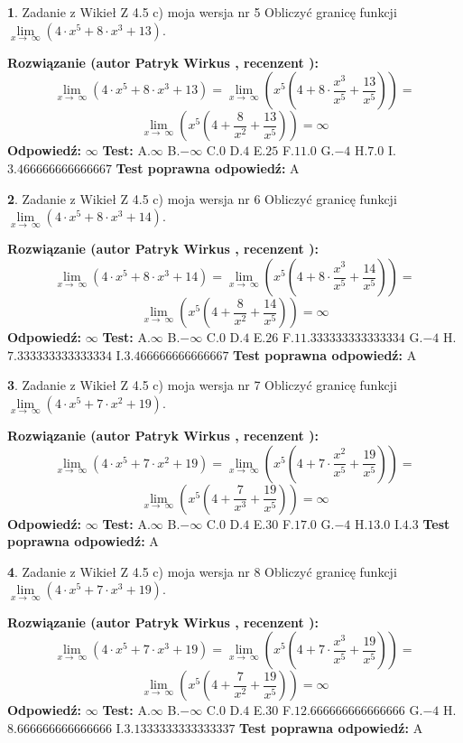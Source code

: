 \documentclass[12pt, a4paper]{article}
\theoremstyle{definition} %
\newtheorem{zad}{}
\newcommand{\zadStart}[1]{\begin{zad}#1\newline}
\newcommand{\zadStop}{\end{zad}}
\newcommand{\rozwStart}[2]{\noindent \textbf{Rozwiązanie (autor #1 , recenzent #2): }\newline}
\newcommand{\rozwStop}{\newline}
\newcommand{\odpStart}{\noindent \textbf{Odpowiedź:}\newline}
\newcommand{\odpStop}{\newline}
\newcommand{\testStart}{\noindent \textbf{Test:}\newline}
\newcommand{\testStop}{\newline}
\newcommand{\kluczStart}{\noindent \textbf{Test poprawna odpowiedź:}\newline}
\newcommand{\kluczStop}{\newline}
\begin{document}
\zadStart{Zadanie z Wikieł Z 4.5 c) moja wersja nr 5}
Obliczyć granicę funkcji  $\lim\limits_{x\to\ \infty}(4 \cdot x^{5}+8 \cdot x^{3}+13)$.
\zadStop
\rozwStart{Patryk Wirkus}{}
$$\lim\limits_{x\to\ \infty}(4 \cdot x^{5}+8 \cdot x^{3}+13) = \lim\limits_{x\to\ \infty}(x^{5}(4 +8 \cdot \frac{x^{3}}{x^{5}}+\frac{13}{x^{5}})) =$$ $$\lim\limits_{x\to\ \infty}(x^{5}(4 +\frac{8}{x^{2}}+\frac{13}{x^{5}})) =\infty$$
\rozwStop
\odpStart
$\infty$
\odpStop
\testStart
A.$\infty$ B.$-\infty$ C.$0$ D.$4$ E.$25$
F.$11.0$ G.$-4$
H.$7.0$
I.$3.466666666666667$
\testStop
\kluczStart
A
\kluczStop



\zadStart{Zadanie z Wikieł Z 4.5 c) moja wersja nr 6}
Obliczyć granicę funkcji  $\lim\limits_{x\to\ \infty}(4 \cdot x^{5}+8 \cdot x^{3}+14)$.
\zadStop
\rozwStart{Patryk Wirkus}{}
$$\lim\limits_{x\to\ \infty}(4 \cdot x^{5}+8 \cdot x^{3}+14) = \lim\limits_{x\to\ \infty}(x^{5}(4 +8 \cdot \frac{x^{3}}{x^{5}}+\frac{14}{x^{5}})) =$$ $$\lim\limits_{x\to\ \infty}(x^{5}(4 +\frac{8}{x^{2}}+\frac{14}{x^{5}})) =\infty$$
\rozwStop
\odpStart
$\infty$
\odpStop
\testStart
A.$\infty$ B.$-\infty$ C.$0$ D.$4$ E.$26$
F.$11.333333333333334$ G.$-4$
H.$7.333333333333334$
I.$3.466666666666667$
\testStop
\kluczStart
A
\kluczStop



\zadStart{Zadanie z Wikieł Z 4.5 c) moja wersja nr 7}
Obliczyć granicę funkcji  $\lim\limits_{x\to\ \infty}(4 \cdot x^{5}+7 \cdot x^{2}+19)$.
\zadStop
\rozwStart{Patryk Wirkus}{}
$$\lim\limits_{x\to\ \infty}(4 \cdot x^{5}+7 \cdot x^{2}+19) = \lim\limits_{x\to\ \infty}(x^{5}(4 +7 \cdot \frac{x^{2}}{x^{5}}+\frac{19}{x^{5}})) =$$ $$\lim\limits_{x\to\ \infty}(x^{5}(4 +\frac{7}{x^{3}}+\frac{19}{x^{5}})) =\infty$$
\rozwStop
\odpStart
$\infty$
\odpStop
\testStart
A.$\infty$ B.$-\infty$ C.$0$ D.$4$ E.$30$
F.$17.0$ G.$-4$
H.$13.0$
I.$4.3$
\testStop
\kluczStart
A
\kluczStop



\zadStart{Zadanie z Wikieł Z 4.5 c) moja wersja nr 8}
Obliczyć granicę funkcji  $\lim\limits_{x\to\ \infty}(4 \cdot x^{5}+7 \cdot x^{3}+19)$.
\zadStop
\rozwStart{Patryk Wirkus}{}
$$\lim\limits_{x\to\ \infty}(4 \cdot x^{5}+7 \cdot x^{3}+19) = \lim\limits_{x\to\ \infty}(x^{5}(4 +7 \cdot \frac{x^{3}}{x^{5}}+\frac{19}{x^{5}})) =$$ $$\lim\limits_{x\to\ \infty}(x^{5}(4 +\frac{7}{x^{2}}+\frac{19}{x^{5}})) =\infty$$
\rozwStop
\odpStart
$\infty$
\odpStop
\testStart
A.$\infty$ B.$-\infty$ C.$0$ D.$4$ E.$30$
F.$12.666666666666666$ G.$-4$
H.$8.666666666666666$
I.$3.1333333333333337$
\testStop
\kluczStart
A
\kluczStop
\end{document}
